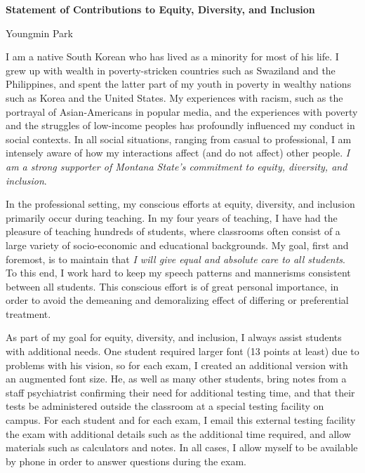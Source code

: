 \documentclass[a4paper,11pt]{article}
\begin{document}
\begin{center}
\Large \textbf{Statement of Contributions to Equity, Diversity, and Inclusion}

\Large Youngmin Park
\end{center}

I am a native South Korean who has lived as a minority for most of his life. I grew up with wealth in poverty-stricken countries such as Swaziland and the Philippines, and spent the latter part of my youth in poverty in wealthy nations such as Korea and the United States. My experiences with racism, such as the portrayal of Asian-Americans in popular media, and the experiences with poverty and the struggles of low-income peoples has profoundly influenced my conduct in social contexts. In all social situations, ranging from casual to professional, I am intensely aware of how my interactions affect (and do not affect) other people. \textit{I am a strong supporter of Montana State's commitment to equity, diversity, and inclusion}.

In the professional setting, my conscious efforts at equity, diversity, and inclusion primarily occur during teaching. In my four years of teaching, I have had the pleasure of teaching hundreds of students, where classrooms often consist of a large variety of socio-economic and educational backgrounds. My goal, first and foremost, is to maintain that \textit{I will give equal and absolute care to all students}. To this end, I work hard to keep my speech patterns and mannerisms consistent between all students. This conscious effort is of great personal importance, in order to avoid the demeaning and demoralizing effect of differing or preferential treatment.

As part of my goal for equity, diversity, and inclusion, I always assist students with additional needs. One student required larger font (13 points at least) due to problems with his vision, so for each exam, I created an additional version with an augmented font size. He, as well as many other students, bring notes from a staff psychiatrist confirming their need for additional testing time, and that their tests be administered outside the classroom at a special testing facility on campus. For each student and for each exam, I email this external testing facility the exam with additional details such as the additional time required, and allow materials such as calculators and notes. In all cases, I allow myself to be available by phone in order to answer questions during the exam.
\end{document}
